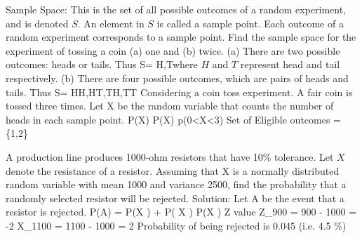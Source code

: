 
 

Sample Space: This is the set of all possible outcomes of a random experiment, and is denoted $S$. An element in $S$ is called a sample point.
Each outcome of a random experiment corresponds to a sample point.
Find the sample space for the experiment of tossing a coin (a) one and (b) twice.
(a) There are two possible outcomes: heads or tails.
Thus
S= {H,T}where $H$ and $T$ represent head and tail respectively.
(b) There are four possible outcomes, which are pairs of heads and tails.
Thus S= {HH,HT,TH,TT} 
Considering a coin toss experiment. A fair coin is tossed three times.
Let X be the random variable that counts the number of heads in each sample point.
P(X)
P(X)
p(0<X<3)
Set of Eligible outcomes = \{1,2\}


A production line produces 1000-ohm resistors that have 10\% tolerance.
Let $X$ denote the resistance of a resistor.
Assuming that X is a normally distributed random variable with mean 1000 and variance 2500, find the probability that a randomly selected resistor will be rejected.
Solution:
Let A be the event that a resistor is rejected.
P(A)  = P(X ) + P( X )
P(X )
Z value
Z_{900} = { 900 - 1000} = -2
X_{1100} = { 1100 - 1000} = 2
Probability of being rejected is 0.045 (i.e. 4.5 \%)

